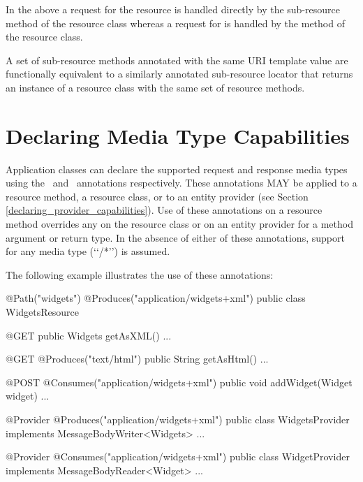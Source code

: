 In the above a  request for the  resource is handled directly by the  sub-resource method of the resource class  whereas a  request for  is handled by the  method of the  resource class.

\begin{nnnote}A set of sub-resource methods annotated with the same URI template value are functionally equivalent to a similarly annotated sub-resource locator that returns an instance of a resource class with the same set of resource methods.\end{nnnote}

\section{Declaring Media Type Capabilities}
\label{declaring_method_capabilities}

Application classes can declare the supported request and response media types using the \Consumes\ and \Produces\ annotations respectively. These annotations MAY be applied to a resource method, a resource class, or to an entity provider (see Section \ref{declaring_provider_capabilities}). Use of these annotations on a resource method overrides any on the resource class or on an entity provider for a method argument or return type. In the absence of either of these annotations, support for any media type (\lq\lq*/*\rq\rq) is assumed.

The following example illustrates the use of these annotations:

\begin{listing}{1}
@Path("widgets")
@Produces("application/widgets+xml")
public class WidgetsResource {
  
  @GET
  public Widgets getAsXML() {...}
  
  @GET
  @Produces("text/html")
  public String getAsHtml() {...}
  
  @POST
  @Consumes("application/widgets+xml")
  public void addWidget(Widget widget) {...}
}

@Provider
@Produces("application/widgets+xml")
public class WidgetsProvider implements MessageBodyWriter<Widgets> {...}

@Provider
@Consumes("application/widgets+xml")
public class WidgetProvider implements MessageBodyReader<Widget> {...}
\end{listing}

